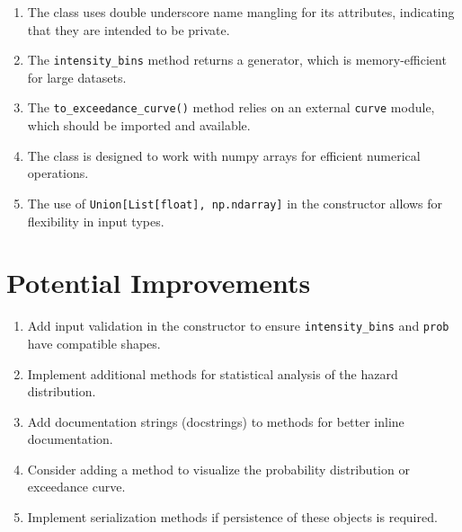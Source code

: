 \documentclass{article}
\begin{document}
\begin{enumerate}
    \item The class uses double underscore name mangling for its attributes, indicating that they are intended to be private.

    \item The \texttt{intensity\_bins} method returns a generator, which is memory-efficient for large datasets.

    \item The \texttt{to\_exceedance\_curve()} method relies on an external \texttt{curve} module, which should be imported and available.

    \item The class is designed to work with numpy arrays for efficient numerical operations.

    \item The use of \texttt{Union[List[float], np.ndarray]} in the constructor allows for flexibility in input types.
\end{enumerate}

\section{Potential Improvements}

\begin{enumerate}
    \item Add input validation in the constructor to ensure \texttt{intensity\_bins} and \texttt{prob} have compatible shapes.

    \item Implement additional methods for statistical analysis of the hazard distribution.

    \item Add documentation strings (docstrings) to methods for better inline documentation.

    \item Consider adding a method to visualize the probability distribution or exceedance curve.

    \item Implement serialization methods if persistence of these objects is required.
\end{enumerate}
\end{document}
